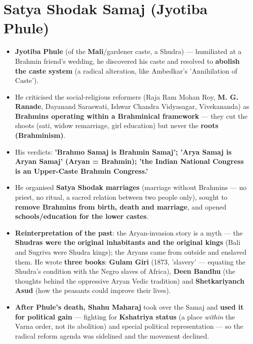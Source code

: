 \section{Satya Shodak Samaj (Jyotiba Phule)}

\begin{KeyConcept}
\begin{itemize}
\item \textbf{Jyotiba Phule} (of the \textbf{Mali}/gardener caste, a Shudra) --- humiliated at a Brahmin friend's wedding, he discovered his caste and resolved to \textbf{abolish the caste system} (a radical alteration, like Ambedkar's 'Annihilation of Caste').
\item He criticised the social-religious reformers (Raja Ram Mohan Roy, \textbf{M. G. Ranade}, Dayanand Saraswati, Ishwar Chandra Vidyasagar, Vivekananda) as \textbf{Brahmins operating within a Brahminical framework} --- they cut the shoots (sati, widow remarriage, girl education) but never the \textbf{roots (Brahminism)}.
\item His verdicts: \textbf{'Brahmo Samaj is Brahmin Samaj'; 'Arya Samaj is Aryan Samaj' (Aryan = Brahmin); 'the Indian National Congress is an Upper-Caste Brahmin Congress.'}
\item He organised \textbf{Satya Shodak marriages} (marriage without Brahmins --- no priest, no ritual, a sacred relation between two people only), sought to \textbf{remove Brahmins from birth, death and marriage}, and opened \textbf{schools/education for the lower castes}.
\item \textbf{Reinterpretation of the past}: the Aryan-invasion story is a myth --- the \textbf{Shudras were the original inhabitants and the original kings} (Bali and Sugriva were Shudra kings); the Aryans came from outside and enslaved them. He wrote \textbf{three books}: \textbf{Gulam Giri} (1873, 'slavery' --- equating the Shudra's condition with the Negro slaves of Africa), \textbf{Deen Bandhu} (the thoughts behind the oppressive Aryan Vedic tradition) and \textbf{Shetkariyanch Asud} (how the peasants could improve their lives).
\item \textbf{After Phule's death, Shahu Maharaj} took over the Samaj and \textbf{used it for political gain} --- fighting for \textbf{Kshatriya status} (a place \emph{within} the Varna order, not its abolition) and special political representation --- so the radical reform agenda was sidelined and the movement declined.
\end{itemize}
\end{KeyConcept}

